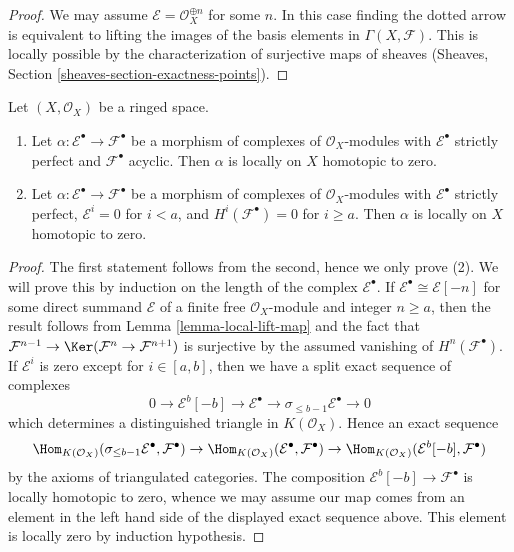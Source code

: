 \begin{proof}
We may assume $\mathcal{E} = \mathcal{O}_X^{\oplus n}$ for some $n$.
In this case finding the dotted arrow is equivalent to lifting the
images of the basis elements in $\Gamma(X, \mathcal{F})$. This is
locally possible by the characterization of surjective maps of
sheaves (Sheaves, Section \ref{sheaves-section-exactness-points}).
\end{proof}

\begin{lemma}
\label{lemma-local-homotopy}
Let $(X, \mathcal{O}_X)$ be a ringed space.
\begin{enumerate}
\item Let $\alpha : \mathcal{E}^\bullet \to \mathcal{F}^\bullet$
be a morphism of complexes of $\mathcal{O}_X$-modules
with $\mathcal{E}^\bullet$ strictly perfect and $\mathcal{F}^\bullet$
acyclic. Then $\alpha$ is locally on $X$ homotopic to zero.
\item Let $\alpha : \mathcal{E}^\bullet \to \mathcal{F}^\bullet$
be a morphism of complexes of $\mathcal{O}_X$-modules
with $\mathcal{E}^\bullet$ strictly perfect, $\mathcal{E}^i = 0$
for $i < a$, and $H^i(\mathcal{F}^\bullet) = 0$ for $i \geq a$.
Then $\alpha$ is locally on $X$ homotopic to zero.
\end{enumerate}
\end{lemma}

\begin{proof}
The first statement follows from the second, hence we only prove (2).
We will prove this by induction on the length of the complex
$\mathcal{E}^\bullet$. If $\mathcal{E}^\bullet \cong \mathcal{E}[-n]$
for some direct summand $\mathcal{E}$ of a finite free
$\mathcal{O}_X$-module and integer $n \geq a$, then the result follows from
Lemma \ref{lemma-local-lift-map} and the fact that
$\mathcal{F}^{n - 1} \to \Ker(\mathcal{F}^n \to \mathcal{F}^{n + 1})$
is surjective by the assumed vanishing of $H^n(\mathcal{F}^\bullet)$.
If $\mathcal{E}^i$ is zero except for $i \in [a, b]$, then we have a
split exact sequence of complexes
$$
0 \to \mathcal{E}^b[-b] \to \mathcal{E}^\bullet \to
\sigma_{\leq b - 1}\mathcal{E}^\bullet \to 0
$$
which determines a distinguished triangle in
$K(\mathcal{O}_X)$. Hence an exact sequence
$$
\Hom_{K(\mathcal{O}_X)}(
\sigma_{\leq b - 1}\mathcal{E}^\bullet, \mathcal{F}^\bullet)
\to
\Hom_{K(\mathcal{O}_X)}(\mathcal{E}^\bullet, \mathcal{F}^\bullet)
\to
\Hom_{K(\mathcal{O}_X)}(\mathcal{E}^b[-b], \mathcal{F}^\bullet)
$$
by the axioms of triangulated categories. The composition
$\mathcal{E}^b[-b] \to \mathcal{F}^\bullet$ is locally homotopic to
zero, whence we may assume our map comes from an element in the
left hand side of the displayed exact sequence above. This element
is locally zero by induction hypothesis.
\end{proof}


